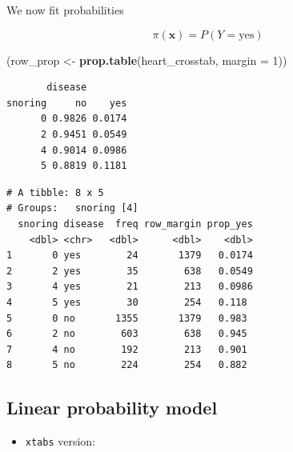 \documentclass[]{book}
\newenvironment{Shaded}{\begin{snugshade}}{\end{snugshade}}
\newcommand{\DataTypeTok}[1]{\textcolor[rgb]{0.13,0.29,0.53}{#1}}
\newcommand{\DecValTok}[1]{\textcolor[rgb]{0.00,0.00,0.81}{#1}}
\newcommand{\KeywordTok}[1]{\textcolor[rgb]{0.13,0.29,0.53}{\textbf{#1}}}
\newcommand{\NormalTok}[1]{#1}
\newcommand{\OperatorTok}[1]{\textcolor[rgb]{0.81,0.36,0.00}{\textbf{#1}}}
\newcommand{\StringTok}[1]{\textcolor[rgb]{0.31,0.60,0.02}{#1}}
\providecommand{\tightlist}{%
  \setlength{\itemsep}{0pt}\setlength{\parskip}{0pt}}
\begin{document}
We now fit probabilities

\[\pi(\mathbf{x}) = P(Y = \text{yes})\]

\begin{Shaded}
\begin{Highlighting}[]
\NormalTok{(row_prop <-}\StringTok{ }\KeywordTok{prop.table}\NormalTok{(heart_crosstab, }\DataTypeTok{margin =} \DecValTok{1}\NormalTok{))}
\end{Highlighting}
\end{Shaded}

\begin{verbatim}
       disease
snoring     no    yes
      0 0.9826 0.0174
      2 0.9451 0.0549
      4 0.9014 0.0986
      5 0.8819 0.1181
\end{verbatim}

\begin{Shaded}
\end{Shaded}

\begin{verbatim}
# A tibble: 8 x 5
# Groups:   snoring [4]
  snoring disease  freq row_margin prop_yes
    <dbl> <chr>   <dbl>      <dbl>    <dbl>
1       0 yes        24       1379   0.0174
2       2 yes        35        638   0.0549
3       4 yes        21        213   0.0986
4       5 yes        30        254   0.118 
5       0 no       1355       1379   0.983 
6       2 no        603        638   0.945 
7       4 no        192        213   0.901 
8       5 no        224        254   0.882 
\end{verbatim}

\hypertarget{linear-probability-model-1}{%
\subsection{Linear probability model}\label{linear-probability-model-1}}

\begin{itemize}
\tightlist
\item
  \texttt{xtabs} version:
\end{itemize}
\end{document}
